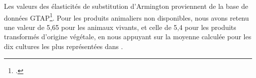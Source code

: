 Les valeurs des élasticités de substitution d'Armington proviennent de la base de données GTAP\footcite{Aguiar2022}. Pour les produits animaliers non disponibles, nous avons retenu une valeur de 5,65 pour les animaux vivants, et celle de 5,4 pour les produits transformés d'origine végétale, en nous appuyant sur la moyenne calculée pour les dix cultures les plus représentées dans \cite{Costinot2016}.
